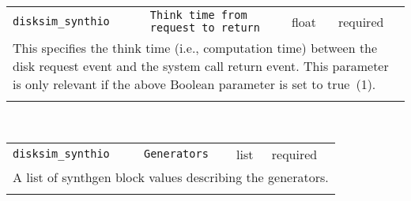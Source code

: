 \noindent 
\begin{tabular}{|p{\lpmodwidth}|p{\lpnamewidth}|p{0.5in}|p{0.5in}|}
\cline{1-4}
\texttt{disksim\_synthio} & \texttt{Think time from request to return} & float & required \\ 
\cline{1-4}
\multicolumn{4}{|p{6in}|}{
This specifies the think time (i.e., computation time) between the disk
request event and the system call return event. This parameter is
only relevant if the above Boolean parameter is set to true~(1).
}\\ 
\cline{1-4}
\multicolumn{4}{p{5in}}{}\\
\end{tabular}\\ 
\noindent 
\begin{tabular}{|p{\lpmodwidth}|p{\lpnamewidth}|p{0.5in}|p{0.5in}|}
\cline{1-4}
\texttt{disksim\_synthio} & \texttt{Generators} & list & required \\ 
\cline{1-4}
\multicolumn{4}{|p{6in}|}{
A list of synthgen block values describing the generators.
}\\ 
\cline{1-4}
\multicolumn{4}{p{5in}}{}\\
\end{tabular}\\ 
